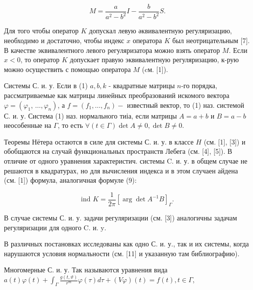 \documentclass[10pt]{article}
\begin{document}
\[

M=\frac{a}{a^{2}-b^{2}} I-\frac{b}{a^{2}-b^{2}} S .

\]



Для того чтобы оператор $K$ допускал левую әквивалентную регуляризацию, необходимо и достаточно, чтобы индекс $x$ оператора $K$ был неотрицательным [7]. В качестве эквивалентного левого регуляризатора можно взять оператор $M$. Если $x<0$, то оператор $K$ допускает правую эквивалентную регуляризацию, к-рую можно осуществить с помощью оператора $M$ (cм. [1]).



Системы С. и. у. Если в (1) $a, b, k$ - квадратные матрицы $n$-го порядка, рассматриваемые как матрицы линейных преобразований искомого вектора $\varphi=\left(\varphi_{1}\right.$, $\left.\ldots, \varphi_{n}\right)$, а $f=\left(f_{1}, \ldots, f_{n}\right)-$ известный вектор, то (1) наз. системой С. и. у. Система (1) наз. нормального тиіа, если матрицы $A=a+b$ и $B=a-b$ неособенные на $\Gamma$, то есть $\forall(t \in \Gamma) \operatorname{det} A \neq 0, \operatorname{det} B \neq 0$.



Теоремы Нётера остаются в силе для системы С. и. у. в классе $H$ (см. [1], [3]) и обобщаются на случай функциональных пространств Лебега (см. [4], [5]). В отличие от одного уравнения характеристич. системы C. и. у. в общем случае не решаются в квадратурах, но для вычисления индекса и в этом случаен айдена (см. [1]) формула, аналогичная формуле (9):



\[

\text { ind } K=\frac{1}{2 \pi}\left[\arg \operatorname{det} A^{-1} B\right]_{\Gamma} \text {. }

\]



В случае системы С. и. у. задачи регуляризации (см. [3]) аналогичны задачам регуляризации для одного C. и. $\mathrm{y}$.



В различных постановках исследованы как одно С. и. у., так и их системы, когда нарушаются условия нормальности (см. [11] и указанную там библиографию).



Многомерные С. и. у. Так называются уравнения вида $a(t) \varphi(t)+\int_{\Gamma} \frac{g(t, \vartheta)}{r^{m}} \varphi(\tau) d \tau+(V \varphi)(t)=f(t), t \in \Gamma$,
\end{document}
